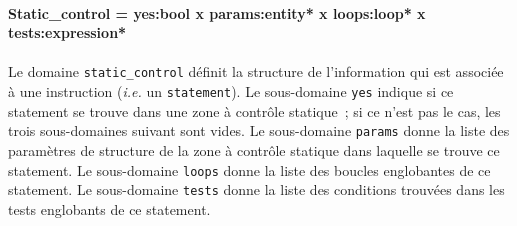 \documentclass{article}
\newcommand{\domain}[2]{\paragraph{{#1}}\paragraph{}{\em #2}}
\begin{document}
\domain{Static\_control = yes:bool x params:entity* x loops:loop* x tests:expression*}
{}

Le domaine {\tt static\_control} d\'efinit la structure de l'information qui 
est associ\'ee \`a une instruction ({\em i.e.} un {\tt statement}). Le 
sous-domaine {\tt yes} indique si ce statement se trouve dans une zone \`a 
contr\^ole statique~; si ce n'est pas le cas, les trois sous-domaines suivant 
sont vides. Le sous-domaine {\tt params} donne la liste des param\`etres de 
structure de la zone \`a contr\^ole statique dans laquelle se trouve ce 
statement. Le sous-domaine {\tt loops} donne la liste des boucles englobantes 
de ce statement. Le sous-domaine {\tt tests} donne la liste des conditions 
trouv\'ees dans les tests englobants de ce statement.
\end{document}
